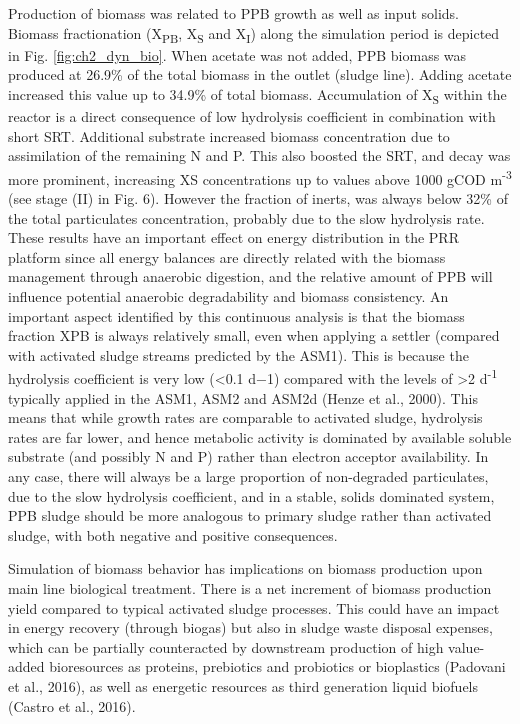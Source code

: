 Production of biomass was related to PPB growth as well as input solids. Biomass fractionation (X\textsubscript{PB}, X\textsubscript{S} and X\textsubscript{I}) along the simulation period is depicted in Fig. \ref{fig:ch2_dyn_bio}. When acetate was not added, PPB biomass was produced at 26.9\% of the total biomass in the outlet (sludge line). Adding acetate increased this value up to 34.9\% of total biomass. Accumulation of X\textsubscript{S} within the reactor is a direct consequence of low hydrolysis coefficient in combination with short SRT. Additional substrate increased biomass concentration due to assimilation of the remaining N and P. This also boosted the SRT, and decay was more prominent, increasing XS concentrations up to values above 1000 gCOD m\textsuperscript{-3} (see stage (II) in Fig. 6). However the fraction of inerts, was always below 32\% of the total particulates concentration, probably due to the slow hydrolysis rate. These results have an important effect on energy distribution in the PRR platform since all energy balances are directly related with the biomass management through anaerobic digestion, and the relative amount of PPB will influence potential anaerobic degradability and biomass consistency. An important aspect identified by this continuous analysis is that the biomass fraction XPB is always relatively small, even when applying a settler (compared with activated sludge streams predicted by the ASM1). This is because the hydrolysis coefficient is very low (<0.1 d−1) compared with the levels of >2 d\textsuperscript{-1} typically applied in the ASM1, ASM2 and ASM2d \cite{Henze1987} (Henze et al., 2000). This means that while growth rates are comparable to activated sludge, hydrolysis rates are far lower, and hence metabolic activity is dominated by available soluble substrate (and possibly N and P) rather than electron acceptor availability. In any case, there will always be a large proportion of non-degraded particulates, due to the slow hydrolysis coefficient, and in a stable, solids dominated system, PPB sludge should be more analogous to primary sludge rather than activated sludge, with both negative and positive consequences.

Simulation of biomass behavior has implications on biomass production upon main line biological treatment. There is a net increment of biomass production yield compared to typical activated sludge processes. This could have an impact in energy recovery (through biogas) but also in sludge waste disposal expenses, which can be partially counteracted by downstream production of high value-added bioresources as proteins, prebiotics and probiotics \cite{Matassa2015} or bioplastics (Padovani et al., 2016), as well as energetic resources as third generation liquid biofuels \cite{Castro2017}(Castro et al., 2016).



